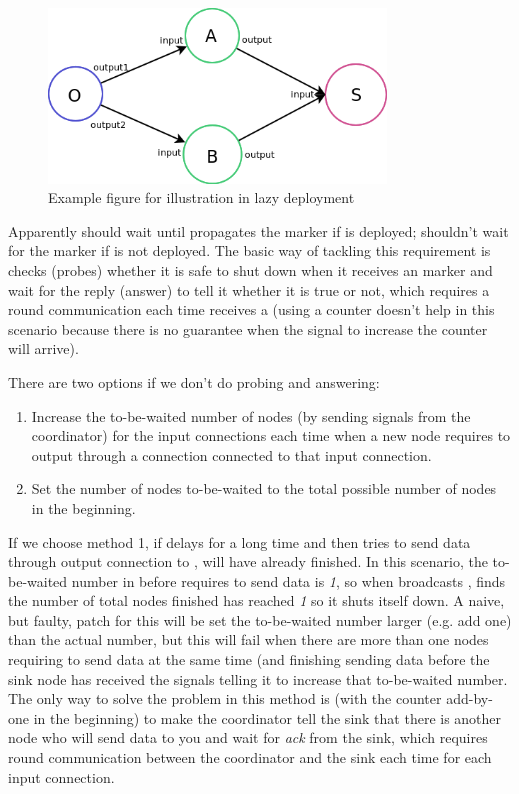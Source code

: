 \begin{figure}[h]
\centering
    \includegraphics[width=0.8\textwidth]{figures/incdep_lazydep_0}
	\caption{Example figure for illustration in lazy deployment}
	\label{fig:incdep_lazydep_0}
\end{figure}

Apparently \ndS should wait until \ndB propagates the \dEOS marker if \ndB is deployed; \ndS shouldn't wait for the \dEOS marker if \ndB is not deployed. The basic way of tackling this requirement is \ndS checks (\ie probes) whether it is safe to shut down when it receives an \dEOS marker and wait for the reply (\ie answer) to tell it whether it is true or not, which requires a round communication each time \ndS receives a \dEOS (using a counter doesn't help in this scenario because there is no guarantee when the signal to increase the counter will arrive).

There are two options if we don't do probing and answering:
\begin{enumerate}
	\item Increase the to-be-waited number of nodes (by sending signals from the coordinator) for the input connections each time when a new node requires to output through a connection connected to that input connection.
	\item Set the number of nodes to-be-waited to the total possible number of nodes in the beginning.
\end{enumerate}

If we choose method 1, if \ndB delays for a long time and then tries to send data through output connection to \ndS, \ndA will have already finished. In this scenario, the to-be-waited number in \ndS before \ndB requires to send data is \emph{1}, so when \ndA broadcasts \dEOS, \ndS finds the number of total nodes finished has reached \emph{1} so it shuts itself down. A naive, but faulty, patch for this will be set the to-be-waited number larger (e.g. add one) than the actual number, but this will fail when there are more than one nodes requiring to send data at the same time (and finishing sending data before the sink node has received the signals telling it to increase that to-be-waited number. The only way to solve the problem in this method is (with the counter add-by-one in the beginning) to make the coordinator tell the sink that there is another node who will send data to you and wait for \textit{ack} from the sink, which requires round communication between the coordinator and the sink each time for each input connection.

